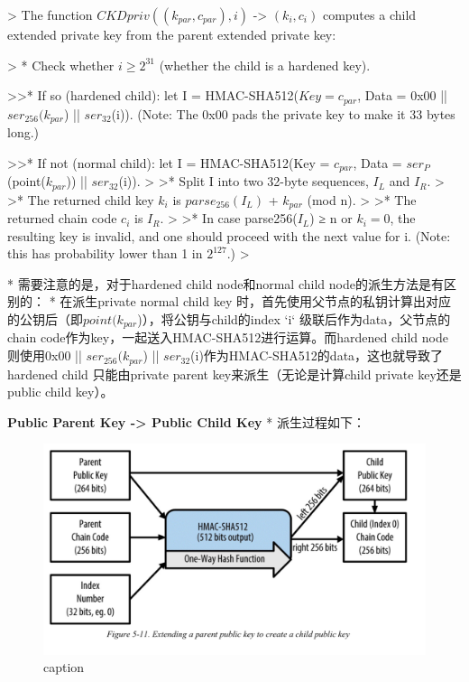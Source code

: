 > The function $CKDpriv((k_{par}, c_{par}), i)$ -> $(k
_i, c_i)$ computes a child extended private key from the parent extended private key:

> * Check whether $i ≥ 2^{31}$ (whether the child is a hardened key).  

>>* If so (hardened child): let I = HMAC-SHA512($Key = c_{par}$, Data = 0x00 || $ser_{256}(k_{par}$) || $ser_{32}$(i)). (Note: The 0x00 pads the private key to make it 33 bytes long.)  

>>* If not (normal child): let I = HMAC-SHA512(Key = $c_{par}$, Data = $ser_P$(point($k_{par}$)) || $ser_{32}$(i)).  
>
>* Split I into two 32-byte sequences, $I_L$ and $I_R$.  
>
>* The returned child key $k_i$ is $parse_{256}(I_L)$ + $k_{par}$ (mod n).
>
>* The returned chain code $c_i$ is $I_R$.  
>
>* In case parse256($I_L$) ≥ n or $k_i = 0$, the resulting key is invalid, and one should proceed with the next value for i. (Note: this has probability lower than 1 in $2^{127}$.)  
>

* 需要注意的是，对于hardened child node和normal child node的派生方法是有区别的：
* 在派生private normal child key 时，首先使用父节点的私钥计算出对应的公钥后（即$point(k_{par}$)），将公钥与child的index `i` 级联后作为data，父节点的chain code作为key，一起送入HMAC-SHA512进行运算。而hardened child node 则使用0x00 || $ser_{256}(k_{par}$) || $ser_{32}$(i)作为HMAC-SHA512的data，这也就导致了hardened child 只能由private parent key来派生（无论是计算child private key还是public child key）。


\textbf{Public Parent Key -> Public Child Key}
* 派生过程如下：

\begin{figure}[h]
\centering
\includegraphics[width=\textwidth]{./CKDpub.png}
\caption{caption}\label{fig-parsesig}
\end{figure}

